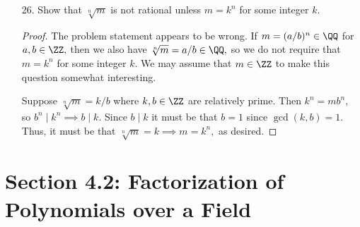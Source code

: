 \documentclass{article}
\begin{document}
\begin{itemize}
	\item[26.] Show that $\sqrt[n]{m}$ is not rational unless $m=k^n$ for some integer $k.$
		\begin{proof}
			The problem statement appears to be wrong. If $m=(a/b)^n\in \QQ$ for $a, b\in \ZZ,$ then we also have $\sqrt[n]{m}=a/b\in \QQ,$ so we do not require that $m=k^n$ for some integer $k.$ We may assume that $m\in \ZZ$ to make this question somewhat interesting.

			Suppose $\sqrt[n]m=k/b$ where $k, b\in \ZZ$ are relatively prime. Then $k^n=mb^n,$ so $b^n\mid k^n\implies b\mid k.$ Since $b\mid k$ it must be that $b=1$ since $\gcd(k, b)=1.$ Thus, it must be that $\sqrt[n]m=k\implies m=k^n,$ as desired. 
		\end{proof}
		
\end{itemize}

\section*{Section 4.2: Factorization of Polynomials over a Field}
\end{document}
